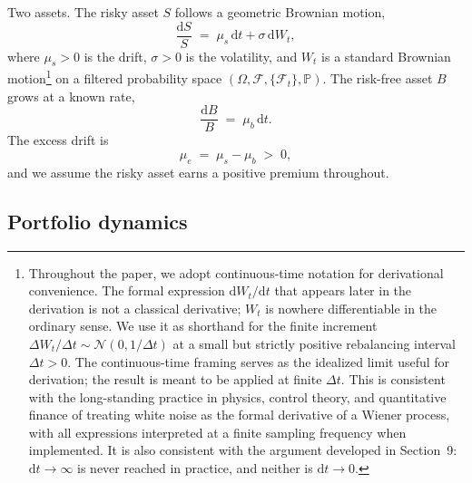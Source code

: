 \documentclass[11pt]{article}
\newcommand{\mue}{\mu_{e}}
\newcommand{\mub}{\mu_{b}}
\newcommand{\mus}{\mu_{s}}
\newcommand{\dd}{\mathrm{d}}
\begin{document}
Two assets. The risky asset $S$ follows a geometric Brownian motion,
\begin{equation}
  \frac{\dd S}{S} \;=\; \mus\,\dd t + \sigma\,\dd W_{t},
  \label{eq:risky}
\end{equation}
where $\mus > 0$ is the drift, $\sigma > 0$ is the volatility, and
$W_{t}$ is a standard Brownian motion\footnote{Throughout the paper,
we adopt continuous-time notation for derivational convenience. The
formal expression $\dd W_{t}/\dd t$ that appears later in the
derivation is not a classical derivative; $W_{t}$ is nowhere
differentiable in the ordinary sense. We use it as shorthand for the
finite increment $\Delta W_{t}/\Delta t \sim \mathcal{N}(0,
1/\Delta t)$ at a small but strictly positive rebalancing interval
$\Delta t > 0$. The continuous-time framing serves as the idealized
limit useful for derivation; the result is meant to be applied at
finite $\Delta t$. This is consistent with the long-standing
practice in physics, control theory, and quantitative finance of
treating white noise as the formal derivative of a Wiener process,
with all expressions interpreted at a finite sampling frequency
when implemented. It is also consistent with the argument developed
in Section~9: $\dd t \to \infty$ is never reached in practice, and
neither is $\dd t \to 0$.} on a filtered probability space
$(\Omega, \mathcal{F}, \{\mathcal{F}_{t}\}, \mathbb{P})$. The
risk-free asset $B$ grows at a known rate,
\begin{equation}
  \frac{\dd B}{B} \;=\; \mub\,\dd t.
  \label{eq:riskfree}
\end{equation}
The excess drift is
\begin{equation}
  \mue \;=\; \mus - \mub \;>\; 0,
  \label{eq:excess}
\end{equation}
and we assume the risky asset earns a positive premium throughout.

\subsection{Portfolio dynamics}
\end{document}
